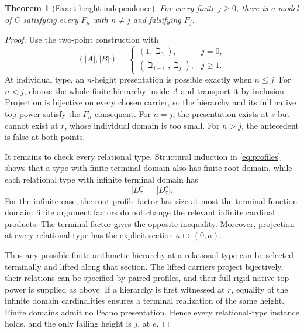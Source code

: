 \documentclass[11pt,letterpaper,numbers=noenddot]{scrartcl}
\numberwithin{equation}{section}
\newtheorem{theorem}{Theorem}[section]
\theoremstyle{definition}
\begin{document}
\begin{theorem}[Exact-height independence]\label{thm:independence}
For every finite $j\ge0$, there is a model of $C$ satisfying every $F_n$ with $n\ne j$ and falsifying $F_j$.
\end{theorem}

\begin{proof}
Use the two-point construction with
\begin{equation}\label{eq:cardinal-models}
(|A|,|B|)=
\begin{cases}
(1,\beth_0),&j=0,\\
(\beth_{j-1},\beth_j),&j\ge1.
\end{cases}
\end{equation}
At individual type, an $n$-height presentation is possible exactly when $n\le j$. For $n<j$, choose the whole finite hierarchy inside $A$ and transport it by inclusion. Projection is bijective on every chosen carrier, so the hierarchy and its full native top power satisfy the $F_n$ consequent. For $n=j$, the presentation exists at $s$ but cannot exist at $r$, whose individual domain is too small. For $n>j$, the antecedent is false at both points.

It remains to check every relational type. Structural induction in \eqref{eq:profiles} shows that a type with finite terminal domain also has finite root domain, while each relational type with infinite terminal domain has
\[
|D_\tau^r|=|D_\tau^s|.
\]
For the infinite case, the root profile factor has size at most the terminal function domain: finite argument factors do not change the relevant infinite cardinal products. The terminal factor gives the opposite inequality. Moreover, projection at every relational type has the explicit section $a\mapsto(0,a)$.

Thus any possible finite arithmetic hierarchy at a relational type can be selected terminally and lifted along that section. The lifted carriers project bijectively, their relations can be specified by paired profiles, and their full rigid native top power is supplied as above. If a hierarchy is first witnessed at $r$, equality of the infinite domain cardinalities ensures a terminal realization of the same height. Finite domains admit no Peano presentation. Hence every relational-type instance holds, and the only failing height is $j$, at $e$.
\end{proof}
\end{document}
